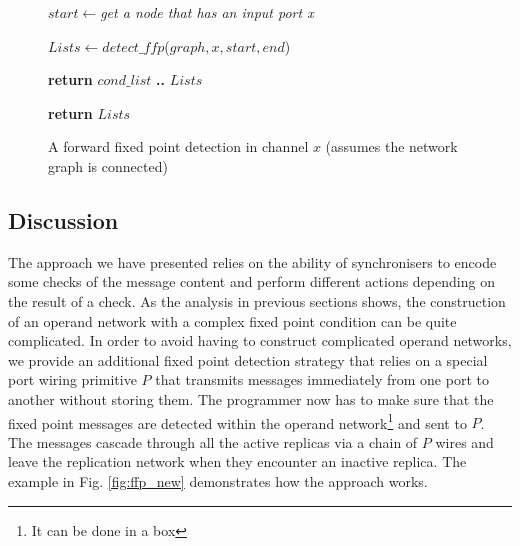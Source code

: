 \begin{figure}
{\begin{minipage}{\dimexpr\linewidth-2\fboxsep-2\fboxrule\relax}
\begin{algorithmic}[1]
    \State $start\gets$\emph{get a node that has an input port x}

    \State $Lists\gets detect\_ffp$($graph, x, start, end$) %
      
      \State \textbf{return} $cond\_list$ \textbf{..} $Lists$

    \EndIf
    \State \textbf{return} $Lists$
  \EndIf

\EndFunction
\end{algorithmic}
\end{minipage}%
}
\caption{A forward fixed point detection in channel $x$ (assumes the network graph is connected)\label{fig:ffp_detect}}
\end{figure}


    \subsection{Discussion}
The approach we have presented relies on the ability of synchronisers to encode some checks of the message content and perform different actions depending on the result of a check. As the analysis in previous sections shows, the construction of an operand network with a complex fixed point condition can be quite complicated. In order to avoid having to construct complicated operand networks, we provide an additional fixed point detection strategy that relies on a special port wiring primitive $P$ that transmits messages immediately from one port to another without storing them. The programmer now has to make sure that the fixed point messages are detected within the operand network\footnote{It can be done in a box} and sent to $P$. The messages cascade through all the active replicas via a chain of $P$ wires and leave the replication network when they encounter an inactive replica. The example in Fig. \ref{fig:ffp_new} demonstrates how the approach works.

